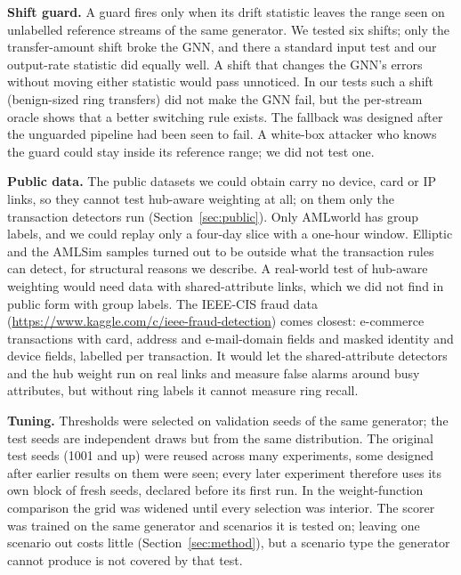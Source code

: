 \textbf{Shift guard.} A guard fires only when its drift statistic leaves the
range seen on unlabelled reference streams of the same generator. We tested six
shifts; only the transfer-amount shift broke the GNN, and there a standard input
test and our output-rate statistic did equally well. A shift that changes the
GNN's errors without moving either statistic would pass unnoticed. In our tests
such a shift (benign-sized ring transfers) did not make the GNN fail, but the
per-stream oracle shows that a better switching rule exists. The fallback was
designed after the unguarded pipeline had been seen to fail. A white-box attacker
who knows the guard could stay inside its reference range; we did not test one.

\textbf{Public data.} The public datasets we could obtain carry no device,
card or IP links, so they cannot test hub-aware weighting at all; on them only
the transaction detectors run (Section~\ref{sec:public}). Only AMLworld has
group labels, and we could replay only a four-day slice with a one-hour window.
Elliptic and the AMLSim samples turned out to be outside what the transaction
rules can detect, for structural reasons we describe. A real-world test of
hub-aware weighting would need data with shared-attribute links, which we did
not find in public form with group labels. The IEEE-CIS fraud data
(\url{https://www.kaggle.com/c/ieee-fraud-detection}) comes
closest: e-commerce transactions with card, address and e-mail-domain fields
and masked identity and device fields, labelled per transaction. It would let
the shared-attribute detectors and the hub weight run on real links and measure
false alarms around busy attributes, but without ring labels it cannot measure
ring recall.

\textbf{Tuning.} Thresholds were selected on validation seeds of the same
generator; the test seeds are independent draws but from the same
distribution. The original test seeds (1001 and up) were reused across many
experiments, some designed after earlier results on them were seen; every
later experiment therefore uses its own block of fresh seeds, declared before
its first run. In the weight-function comparison the grid was
widened until every selection was interior. The scorer was trained on the same
generator and scenarios it is tested on; leaving one scenario out costs little
(Section~\ref{sec:method}), but a scenario type the generator cannot produce is
not covered by that test.

